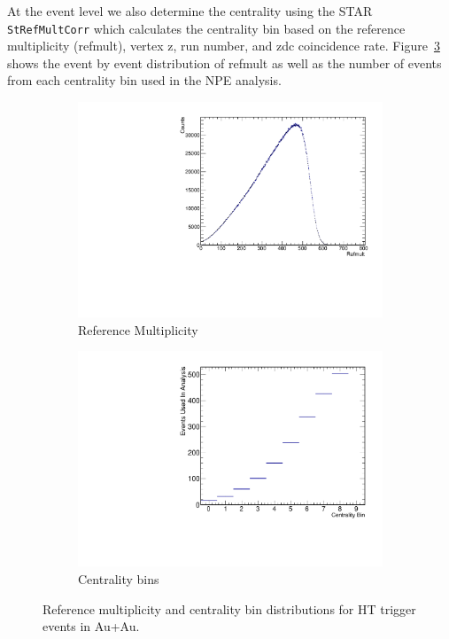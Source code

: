 At the event level we also determine the centrality using the STAR \texttt{StRefMultCorr} which calculates the centrality bin based on the reference multiplicity (refmult), vertex z, run number, and zdc coincidence rate. Figure~\ref{fig:EventCent} shows the event by event distribution of refmult as well as the number of events from each centrality bin used in the NPE analysis.
 
\begin{figure}[htbp]
    \begin{subfigure}{0.5\textwidth}
        \includegraphics[width=\textwidth]{Plots/NPE/RefmultNPE18.pdf}
        \caption{Reference Multiplicity}
        \label{fig:refmult}
    \end{subfigure}
    \begin{subfigure}{0.5\textwidth}
        \includegraphics[width=\textwidth]{Plots/NPE/Centrality_dist.pdf}
        \caption{Centrality bins}
        \label{fig:centdist}
    \end{subfigure}
\caption[Refmult and Centrality Distributions]{Reference multiplicity and centrality bin distributions for HT trigger events in Au+Au.}
\label{fig:EventCent}
\end{figure}

